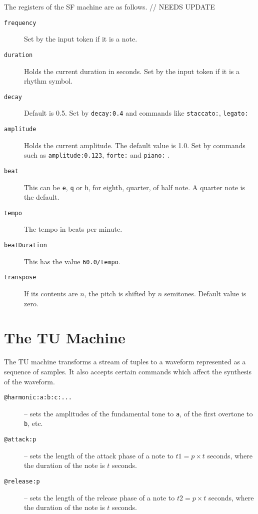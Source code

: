 \documentclass[11pt]{amsart}
\begin{document}
The registers of the SF machine are as follows. // NEEDS UPDATE

\begin{description}

	\item[{\tt frequency}] Set by the input token if it is a note.
	
	\item[{\tt duration}]  Holds the current duration in seconds.  Set by the input token if it
	        is a rhythm symbol.
	        
	\item[{\tt decay}] Default is 0.5. Set by {\tt decay:0.4} and commands like 
	{\tt staccato:}, {\tt legato:} 
	        
	\item[{\tt amplitude}] Holds the current amplitude.  The default value is 1.0.  Set by
	commands such as {\tt amplitude:0.123}, {\tt forte:} and {\tt piano:} .
	
	\item[{\tt beat}] This can be {\tt e}, {\tt q} or {\tt h}, for eighth, quarter, of half note.
	A quarter note is the default.
	
	\item[{\tt tempo}]  The tempo in beats per minute.  
	
	\item[{\tt beatDuration}] This has the value {\tt 60.0/tempo}.
	
	\item[{\tt transpose}]  If its contents are $n$, the pitch is shifted by
	$n$ semitones.  Default value is zero.

\end{description}



\section{The TU Machine}

The TU machine transforms a stream of tuples to a waveform represented as
a sequence of samples.  It also accepts certain commands which affect the 
synthesis of the waveform.

\begin{description}

  \item[{\tt @harmonic:a:b:c:...}] -- sets the amplitudes of the fundamental tone
   to {\tt a}, of the first overtone to {\tt b}, etc.
   
  \item[{\tt @attack:p}] -- sets the length of the attack phase of a note to 
  $t1 = p\times t$ seconds, where the duration of the note is $t$ seconds.
  
  \item[{\tt @release:p}] -- sets the length of the release phase of a note to 
  $t2 = p\times t$ seconds, where the duration of the note is $t$ seconds.
  
\end{description}
\end{document}
